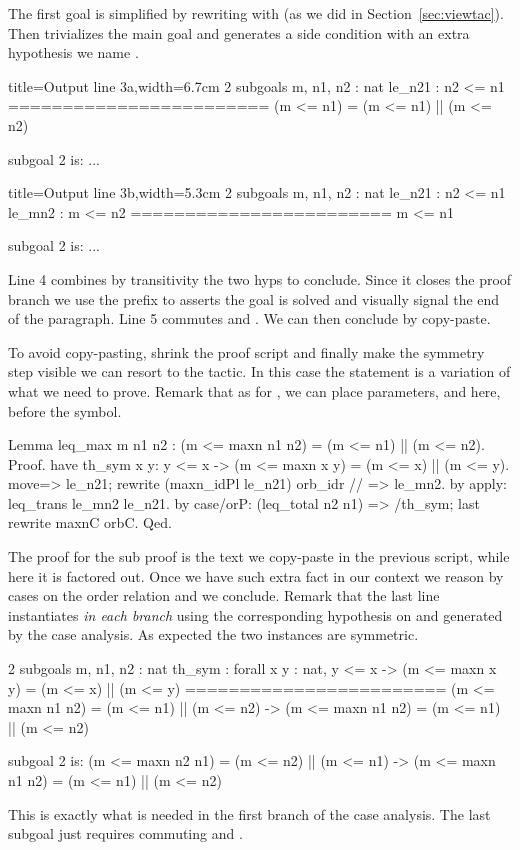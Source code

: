 The first goal is simplified by
rewriting with  (as we did in Section~\ref{sec:viewtac}).
Then  trivializes the main goal and generates a side condition with
an extra hypothesis we name .

\begin{coqout}{}{title=Output line 3a,width=6.7cm}
2 subgoals
m, n1, n2 : nat
le_n21 : n2 <= n1
========================
(m <= n1) = (m <= n1) || (m <= n2)

subgoal 2 is: ...
\end{coqout}
\begin{coqout}{}{title=Output line 3b,width=5.3cm}
2 subgoals
m, n1, n2 : nat
le_n21 : n2 <= n1
le_mn2 : m <= n2
========================
m <= n1

subgoal 2 is: ...
\end{coqout}

Line 4 combines by transitivity the two hyps to conclude.  Since it closes the
proof branch we use the prefix  to asserts the goal is solved and
visually signal the end of the paragraph.  Line 5 commutes  and \C{||}.
We can then conclude by copy-paste.


To avoid copy-pasting, shrink the proof script and finally make the
symmetry step visible we can resort to the  tactic. 
In this case the statement is a variation of what we need to prove.
Remark that as for , we can place parameters,  and 
here, before the \C{:} symbol.

\begin{coq}{}{}
Lemma leq_max m n1 n2 : (m <= maxn n1 n2) = (m <= n1) || (m <= n2).
Proof.
have th_sym x y: y <= x -> (m <= maxn x y) = (m <= x) || (m <= y).
  move=> le_n21; rewrite (maxn_idPl le_n21) orb_idr // => le_mn2.
  by apply: leq_trans le_mn2 le_n21.
by case/orP: (leq_total n2 n1) => /th_sym; last rewrite maxnC orbC.
Qed.
\end{coq}

The proof for the  sub proof is the text we copy-paste in the
previous script, while here it is factored out.
Once we have such extra fact in our context we reason by cases on
the order relation and we conclude.  Remark that the last line instantiates
 \emph{in each branch} using the corresponding
hypothesis on  and  generated by the case analysis.
As expected the two instances are symmetric.

\begin{coqout}{}{}
2 subgoals
m, n1, n2 : nat
th_sym : forall x y : nat,
         y <= x -> (m <= maxn x y) = (m <= x) || (m <= y)
========================
(m <= maxn n1 n2) = (m <= n1) || (m <= n2) ->
(m <= maxn n1 n2) = (m <= n1) || (m <= n2)

subgoal 2 is:
(m <= maxn n2 n1) = (m <= n2) || (m <= n1) ->
(m <= maxn n1 n2) = (m <= n1) || (m <= n2)
\end{coqout}
This is exactly what is needed in the first branch of the case analysis.
The last subgoal just requires commuting  and \C{||}.

